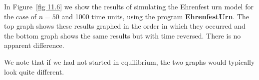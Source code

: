 \begin{example}

\par
In Figure~\ref{fig 11.6} we show the results of simulating the Ehrenfest urn
model for the
case of $n = 50$ and 1000 time units, using the program {\bf 
EhrenfestUrn}.  The top graph shows these results graphed in the
order in which they occurred and the bottom graph shows the same results but with time
reversed.  There is no apparent difference.
\par
We note that if we had not started in equilibrium, the two graphs would
typically
look quite different.
\end{example}

